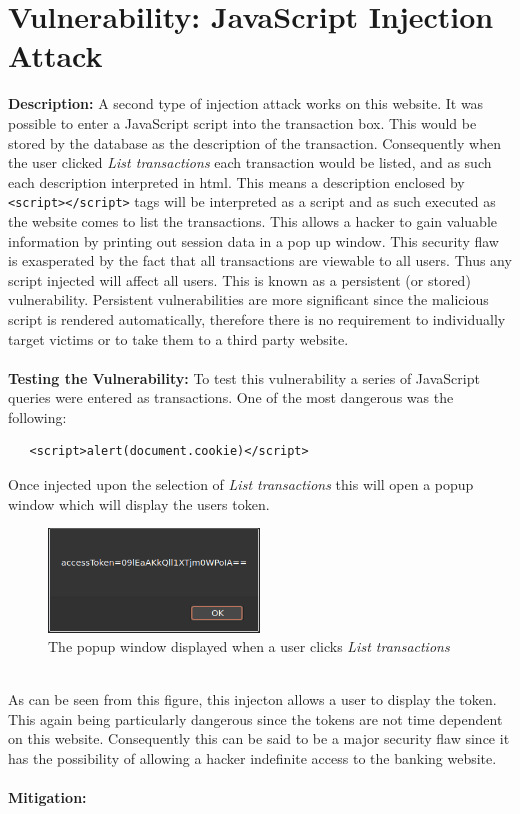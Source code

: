 \section{Vulnerability: JavaScript Injection Attack}
\label{sec:background}
\textbf{Description:} A second type of injection attack works on this website. It was possible to enter a JavaScript script into the transaction box. This would be stored by
the database as the description of the transaction. Consequently when the user clicked \textit{List transactions} each transaction would be listed, and as such each description
interpreted in html. This means a description enclosed by \verb|<script></script>| tags will be interpreted as a script and as such executed as the website comes to list the
transactions. This allows a hacker to gain valuable information by printing out session data in a pop up window. This security flaw is exasperated by the fact that all transactions
are viewable to all users. Thus any script injected will affect all users. This is known as a persistent (or stored) vulnerability. Persistent vulnerabilities are more significant
since the malicious script is rendered automatically, therefore there is no requirement to individually target victims or to take them to a third party website.\\ \\
\textbf{Testing the Vulnerability:} To test this vulnerability a series of JavaScript queries were entered as transactions. One of the most dangerous was the following:
\begin{verbatim}
   <script>alert(document.cookie)</script>
\end{verbatim}
Once injected upon the selection of \textit{List transactions} this will open a popup window which will display the users token.
\begin{figure}[h]
   \centering
   \includegraphics[width=0.5\textwidth]{figs/popup.png}
   \caption{The popup window displayed when a user clicks \textit{List transactions}}
   \label{popup}
\end{figure}\\
As can be seen from this figure, this injecton allows a user to display the token. This again being particularly dangerous since the tokens are not time dependent on this website.
Consequently this can be said to be a major security flaw since it has the possibility of allowing a hacker indefinite access to the banking website.\\ \\
\textbf{Mitigation:} 
 
